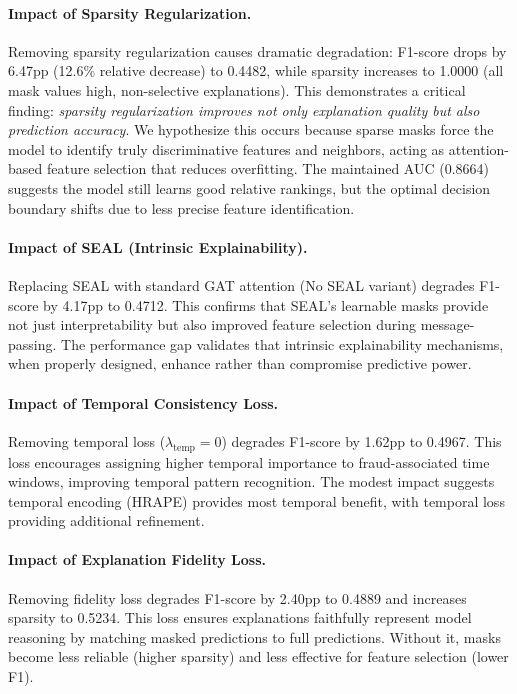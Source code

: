 \paragraph{Impact of Sparsity Regularization.} Removing sparsity regularization causes dramatic degradation: F1-score drops by 6.47pp (12.6\% relative decrease) to 0.4482, while sparsity increases to 1.0000 (all mask values high, non-selective explanations). This demonstrates a critical finding: \textit{sparsity regularization improves not only explanation quality but also prediction accuracy}. We hypothesize this occurs because sparse masks force the model to identify truly discriminative features and neighbors, acting as attention-based feature selection that reduces overfitting. The maintained AUC (0.8664) suggests the model still learns good relative rankings, but the optimal decision boundary shifts due to less precise feature identification.

\paragraph{Impact of SEAL (Intrinsic Explainability).} Replacing SEAL with standard GAT attention (No SEAL variant) degrades F1-score by 4.17pp to 0.4712. This confirms that SEAL's learnable masks provide not just interpretability but also improved feature selection during message-passing. The performance gap validates that intrinsic explainability mechanisms, when properly designed, enhance rather than compromise predictive power.

\paragraph{Impact of Temporal Consistency Loss.} Removing temporal loss ($\lambda_{\text{temp}} = 0$) degrades F1-score by 1.62pp to 0.4967. This loss encourages assigning higher temporal importance to fraud-associated time windows, improving temporal pattern recognition. The modest impact suggests temporal encoding (HRAPE) provides most temporal benefit, with temporal loss providing additional refinement.

\paragraph{Impact of Explanation Fidelity Loss.} Removing fidelity loss degrades F1-score by 2.40pp to 0.4889 and increases sparsity to 0.5234. This loss ensures explanations faithfully represent model reasoning by matching masked predictions to full predictions. Without it, masks become less reliable (higher sparsity) and less effective for feature selection (lower F1).

